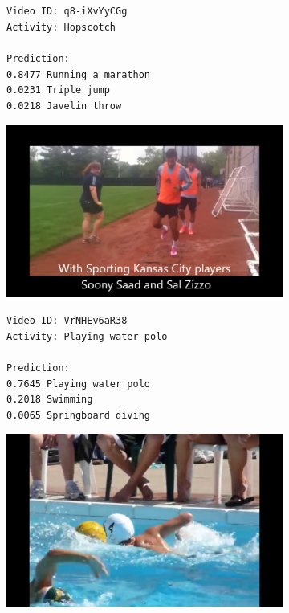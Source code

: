 \begin{figure}[H]
\begin{subfigure}[b]{.4\textwidth}
  \texttt{Video ID: q8-iXvYyCGg \\
  Activity: Hopscotch \\
  \\
  Prediction: \\
  0.8477	Running a marathon \\
  0.0231	Triple jump \\
  0.0218	Javelin throw \\}
\end{subfigure}%
\begin{subfigure}[b]{.6\textwidth}
  \centering
\includegraphics[width=0.95\linewidth]{img/results/activity_classification/results_visualization_classification_3}
\end{subfigure}

\begin{subfigure}[b]{.4\textwidth}
  \texttt{Video ID: VrNHEv6aR38 \\
  Activity: Playing water polo \\
  \\
  Prediction: \\
  0.7645	Playing water polo \\
  0.2018	Swimming \\
  0.0065	Springboard diving\\}
\end{subfigure}%
\begin{subfigure}[b]{.6\textwidth}
  \centering
\includegraphics[width=0.95\linewidth]{img/results/activity_classification/results_visualization_classification_4}
\end{subfigure}


\end{figure}
